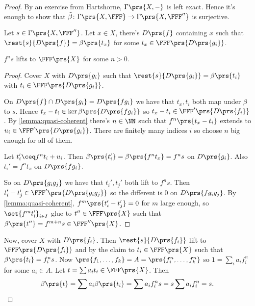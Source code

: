 \documentclass[10pt,a4paper,twoside,openany,hidelinks]{book}
\begin{document}
\begin{proof}
By an exercise from Hartshorne, $\Gamma\prs{X,-}$ is left exact.
Hence it's enough to show that $\tilde{\beta} \colon \Gamma\prs{X,\FFF} \to \Gamma\prs{X,\FFF''}$ is surjective.

Let $s \in \Gamma\prs{X,\FFF''}$.
Let $x \in X$, there's $D\prs{f}$ containing $x$ such that $\rest{s}{D\prs{f}} = \beta\prs{t_x}$ for some $t_x \in \FFF\prs{D\prs{g_i}}$.

\begin{claim}
$f^n s$ lifts to $\FFF\prs{X}$ for some $n > 0$.
\end{claim}

\begin{proof}
Cover $X$ with $D\prs{g_i}$ such that $\rest{s}{D\prs{g_i}} = \beta\prs{t_i}$ with $t_i \in \FFF\prs{D\prs{g_i}}$.

On $D\prs{f} \cap D\prs{g_i} = D\prs{f g_i}$ we have that $t_x, t_i$ both map under $\beta$ to $s$. Hence $t_x - t_i \in \ker \beta \prs{D \prs{f g_i}}$ so $t_x - t_i \in \FFF'\prs{D\prs{f _i}}$.
By \ref{lemma:quasi-coherent} there's $n \in \NN$ such that $f^n \prs{t_x - t_i}$ extends to $u_i \in \FFF'\prs{D\prs{g_i}}$. There are finitely many indices $i$ so choose $n$ big enough for all of them.

Let $t_i' \ceq f^n t_i + u_i$. Then $\beta\prs{t_i'} = \beta\prs{f^n t_x} = f^n s$ on $D\prs{g_i}$.
Also $t_i' = f^n t_x$ on $D\prs{f g_i}$.

So on $D\prs{g_i g_j}$ we have that $t_i', t_j'$ both lift to $f^n s$. Then $t_i' - t_j' \in \FFF'\prs{D\prs{g_i g_j}}$ so the different is $0$ on $D\prs{f g_i g_j}$.
By \ref{lemma:quasi-coherent}, $f^m \prs{t_i' - t_j'} = 0$ for $m$ large enough, so $\set{f^m t_i'}_{i \in I}$ glue to $t'' \in \FFF\prs{X}$ such that $\beta\prs{t''} = f^{m+n}s \in \FFF''\prs{X}$.
\end{proof}

Now, cover $X$ with $D\prs{f_i}$. Then $\rest{s}{D\prs{f_i}}$ lift  to $\FFF\prs{D\prs{f_i}}$ and by the claim to $t_i \in \FFF\prs{X}$ such that $\beta\prs{t_i} = f_i^n s$.
Now
$\prs{f_1, \ldots, f_k} = A = \prs{f_i^n, \ldots, f_k^n}$ so $1 = \sum_{i} a_i f_i^n$ for some $a_i \in A$. Let $t = \sum a_i t_i \in \FFF\prs{X}$.
Then
\[\beta\prs{t} = \sum a_i \beta\prs{t_i} = \sum a_i f_i^n s = s \sum a_i f_i^n = s \text{.}\]
\end{proof}

\begin{proposition}

\end{proposition}

\backmatter
\end{document}

